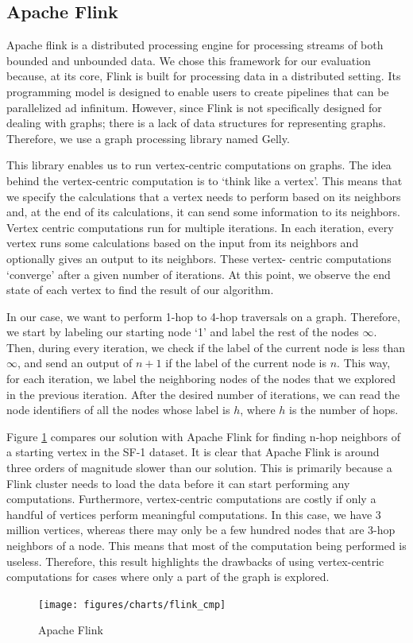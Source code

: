 \subsection{Apache Flink}\label{sec:flinkCmp}
Apache flink\cite{flink} is a distributed processing engine for processing
streams of both bounded and unbounded data. We chose this framework for our
evaluation because, at its core, Flink is built for processing data in a
distributed setting. Its programming model is designed to enable users to create 
pipelines that can be parallelized ad infinitum. However, since
Flink is not specifically designed for dealing with graphs; there is a lack of
data structures for representing graphs. Therefore, we use a graph processing
library named Gelly\cite{flinkGelly}.

\smallskip
This library enables us to run vertex-centric computations on graphs. 
The idea behind the vertex-centric
computation is to `think like a vertex'. This means that we specify the 
calculations that a vertex needs to perform based on its neighbors and, at the
end of its calculations, it can send some information to its
neighbors. Vertex centric computations run for multiple iterations. In each
iteration, every vertex runs some calculations based on the input from its
neighbors and optionally gives an output to its neighbors. These vertex-
centric computations `converge' after a given number of iterations. At this
point, we observe the end state of each vertex to find the result of our
algorithm.  

\smallskip
In our case, we want to perform 1-hop to 4-hop traversals on a graph. Therefore,
we start by labeling our starting node `1' and label the rest of the nodes
$\infty$. Then, during every iteration, we check if the label of the current node
is less than $\infty$, and send an output of $n+1$ if the label of the current
node is $n$. This way, for each iteration, we label the neighboring nodes of
the nodes that we explored in the previous iteration. After the desired number
of iterations, we can read the node identifiers of all the nodes whose label
is $h$, where $h$ is the number of hops.

Figure \ref{fig:flinkCmp} compares our solution with Apache
Flink for finding n-hop neighbors of a starting vertex in the SF-1 dataset. 
It is clear that Apache
Flink is around three orders of magnitude slower than our solution. This is
primarily because a Flink cluster needs to load the data before it can start
performing any computations. Furthermore, vertex-centric computations are
costly if only a handful of vertices perform meaningful
computations. In this case, we have 3 million vertices, whereas there may only be
a few hundred nodes that are 3-hop neighbors of a node. This means that most of
the computation being performed is useless. Therefore, this result highlights
the drawbacks of using vertex-centric computations for cases where only a part
of the graph is explored.
\begin{figure}[ht]
    \centering
    \texttt{[image: figures/charts/flink\_cmp]}
    \caption{Apache Flink}
    \label{fig:flinkCmp}
\end{figure}
\bigskip

